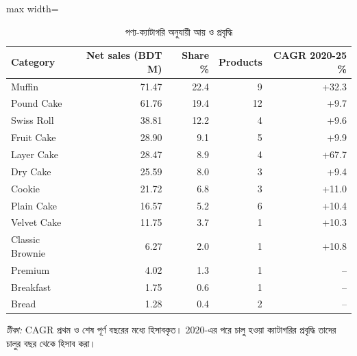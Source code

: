 \begin{table}[htbp]
\centering
\small
\caption{পণ্য-ক্যাটাগরি অনুযায়ী আয় ও প্রবৃদ্ধি}
\label{tab:category}
\begin{adjustbox}{max width=\linewidth}
\begin{tabular}{lrrrr}
\toprule
\textbf{Category} & \textbf{Net sales (BDT M)} & \textbf{Share \%} & \textbf{Products} & \textbf{CAGR 2020-25 \%} \\
\midrule
Muffin & 71.47 & 22.4 & 9 & +32.3 \\
Pound Cake & 61.76 & 19.4 & 12 & +9.7 \\
Swiss Roll & 38.81 & 12.2 & 4 & +9.6 \\
Fruit Cake & 28.90 & 9.1 & 5 & +9.9 \\
Layer Cake & 28.47 & 8.9 & 4 & +67.7 \\
Dry Cake & 25.59 & 8.0 & 3 & +9.4 \\
Cookie & 21.72 & 6.8 & 3 & +11.0 \\
Plain Cake & 16.57 & 5.2 & 6 & +10.4 \\
Velvet Cake & 11.75 & 3.7 & 1 & +10.3 \\
Classic Brownie & 6.27 & 2.0 & 1 & +10.8 \\
Premium & 4.02 & 1.3 & 1 & -- \\
Breakfast & 1.75 & 0.6 & 1 & -- \\
Bread & 1.28 & 0.4 & 2 & -- \\
\bottomrule
\end{tabular}
\end{adjustbox}
\par\smallskip\parbox{0.92\linewidth}{\footnotesize\emph{টীকা:} CAGR প্রথম ও শেষ পূর্ণ বছরের মধ্যে হিসাবকৃত। 2020-এর পরে চালু হওয়া ক্যাটাগরির প্রবৃদ্ধি তাদের চালুর বছর থেকে হিসাব করা।}
\end{table}